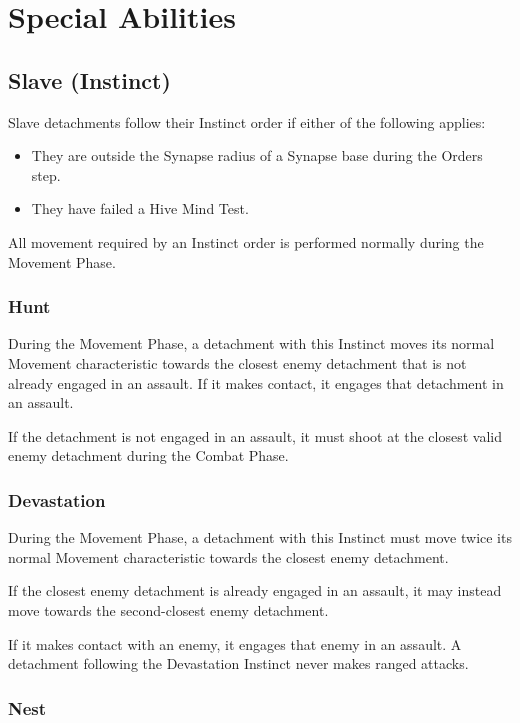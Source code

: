 \section{Special Abilities}

\subsection{Slave (Instinct)}

Slave detachments follow their Instinct order if either of the following applies:

\begin{itemize}
    \item They are outside the Synapse radius of a Synapse base during the Orders step.
    \item They have failed a Hive Mind Test.
\end{itemize}

All movement required by an Instinct order is performed normally during the Movement Phase.

\subsubsection{Hunt}

During the Movement Phase, a detachment with this Instinct moves its normal Movement characteristic towards the closest enemy detachment that is not already engaged in an assault. If it makes contact, it engages that detachment in an assault.

If the detachment is not engaged in an assault, it must shoot at the closest valid enemy detachment during the Combat Phase.

\subsubsection{Devastation}

During the Movement Phase, a detachment with this Instinct must move twice its normal Movement characteristic towards the closest enemy detachment.

If the closest enemy detachment is already engaged in an assault, it may instead move towards the second-closest enemy detachment.

If it makes contact with an enemy, it engages that enemy in an assault. A detachment following the Devastation Instinct never makes ranged attacks.

\subsubsection{Nest}

